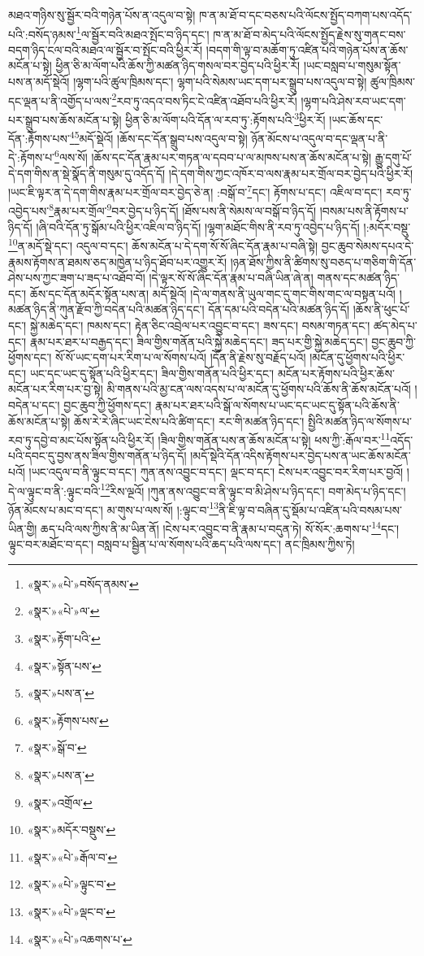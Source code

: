 མཐའ་གཉིས་སུ་སྦྱོར་བའི་གཉེན་པོས་ན་འདུལ་བ་སྟེ། ཁ་ན་མ་ཐོ་བ་དང་བཅས་པའི་ལོངས་སྤྱོད་བཀག་པས་འདོད་པའི་:བསོད་ཉམས་\footnote{«སྣར་»«པེ་»བསོད་ནམས་}ལ་སྦྱོར་བའི་མཐའ་སྤོང་བ་ཉིད་དང་། ཁ་ན་མ་ཐོ་བ་མེད་པའི་ལོངས་སྤྱོད་རྗེས་སུ་གནང་བས་བདག་ཉིད་ངལ་བའི་མཐའ་ལ་སྦྱོར་བ་སྤོང་བའི་ཕྱིར་རོ། །བདག་གི་ལྟ་བ་མཆོག་ཏུ་འཛིན་པའི་གཉེན་པོས་ན་ཆོས་མངོན་པ་སྟེ། ཕྱིན་ཅི་མ་ལོག་པའི་ཆོས་ཀྱི་མཚན་ཉིད་གསལ་བར་བྱེད་པའི་ཕྱིར་རོ། །ཡང་བསླབ་པ་གསུམ་སྟོན་པས་ན་མདོ་སྡེའོ། །ལྷག་པའི་ཚུལ་ཁྲིམས་དང་། ལྷག་པའི་སེམས་ཡང་དག་པར་སྒྲུབ་པས་འདུལ་བ་སྟེ། ཚུལ་ཁྲིམས་དང་ལྡན་པ་ནི་འགྱོད་པ་ལས་\footnote{«སྣར་»«པེ་»ལ་}རབ་ཏུ་འདའ་བས་ཏིང་ངེ་འཛིན་འཐོབ་པའི་ཕྱིར་རོ། །ལྷག་པའི་ཤེས་རབ་ཡང་དག་པར་སྒྲུབ་པས་ཆོས་མངོན་པ་སྟེ། ཕྱིན་ཅི་མ་ལོག་པའི་དོན་ལ་རབ་ཏུ་:རྟོགས་པའི་\footnote{«སྣར་»རྟོག་པའི་}ཕྱིར་རོ། །ཡང་ཆོས་དང་དོན་:རྟོགས་པས་\footnote{«སྣར་»སྟོན་པས་}\footnote{«སྣར་»པས་ན་}མདོ་སྡེའོ། །ཆོས་དང་དོན་སྒྲུབ་པས་འདུལ་བ་སྟེ། ཉོན་མོངས་པ་འདུལ་བ་དང་ལྡན་པ་ནི་དེ་:རྟོགས་པ་\footnote{«སྣར་»རྟོགས་པས་}ལས་སོ། །ཆོས་དང་དོན་རྣམ་པར་གཏན་ལ་དབབ་པ་ལ་མཁས་པས་ན་ཆོས་མངོན་པ་སྟེ། རྒྱུ་དགུ་པོ་དེ་དག་གིས་ན་སྡེ་སྣོད་ནི་གསུམ་དུ་འདོད་དོ། །དེ་དག་གིས་ཀྱང་འཁོར་བ་ལས་རྣམ་པར་གྲོལ་བར་བྱེད་པའི་ཕྱིར་རོ། །ཡང་ཇི་ལྟར་ན་དེ་དག་གིས་རྣམ་པར་གྲོལ་བར་བྱེད་ཅེ་ན། :བསྒོ་བ་\footnote{«སྣར་»སྒོ་བ་}དང་། རྟོགས་པ་དང་། འཇིལ་བ་དང་། རབ་ཏུ་འབྱེད་པས་\footnote{«སྣར་»པས་ན་}རྣམ་པར་གྲོལ་\footnote{«སྣར་»འགྲོལ་}བར་བྱེད་པ་ཉིད་དོ། །ཐོས་པས་ནི་སེམས་ལ་བསྒོ་བ་ཉིད་དོ། །བསམ་པས་ནི་རྟོགས་པ་ཉིད་དོ། །ཞི་བའི་དོན་ཏུ་སྒོམ་པའི་ཕྱིར་འཇིལ་བ་ཉིད་དོ། །ལྷག་མཐོང་གིས་ནི་རབ་ཏུ་འབྱེད་པ་ཉིད་དོ། །:མདོར་བསྡུ་\footnote{«སྣར་»མདོར་བསྡུས་}ན་མདོ་སྡེ་དང་། འདུལ་བ་དང་། ཆོས་མངོན་པ་དེ་དག་སོ་སོ་ཞིང་དོན་རྣམ་པ་བཞི་སྟེ། བྱང་ཆུབ་སེམས་དཔའ་དེ་རྣམས་རྟོགས་ན་ཐམས་ཅད་མཁྱེན་པ་ཉིད་ཐོབ་པར་འགྱུར་རོ། །ཉན་ཐོས་ཀྱིས་ནི་ཚིགས་སུ་བཅད་པ་གཅིག་གི་དོན་ཤེས་པས་ཀྱང་ཟག་པ་ཟད་པ་འཐོབ་བོ། །དེ་ལྟར་སོ་སོ་ཞིང་དོན་རྣམ་པ་བཞི་ཡིན་ཞེ་ན། གནས་དང་མཚན་ཉིད་དང་། ཆོས་དང་དོན་མདོར་སྟོན་པས་ན། མདོ་སྡེའོ། །དེ་ལ་གནས་ནི་ཡུལ་གང་དུ་གང་གིས་གང་ལ་བསྟན་པའོ། །མཚན་ཉིད་ནི་ཀུན་རྫོབ་ཀྱི་བདེན་པའི་མཚན་ཉིད་དང་། དོན་དམ་པའི་བདེན་པའི་མཚན་ཉིད་དོ། །ཆོས་ནི་ཕུང་པོ་དང་། སྐྱེ་མཆེད་དང་། ཁམས་དང་། རྟེན་ཅིང་འབྲེལ་པར་འབྱུང་བ་དང་། ཟས་དང་། བསམ་གཏན་དང་། ཚད་མེད་པ་དང་། རྣམ་པར་ཐར་པ་བརྒྱད་དང་། ཟིལ་གྱིས་གནོན་པའི་སྐྱེ་མཆེད་དང་། ཟད་པར་གྱི་སྐྱེ་མཆེད་དང་། བྱང་ཆུབ་ཀྱི་ཕྱོགས་དང་། སོ་སོ་ཡང་དག་པར་རིག་པ་ལ་སོགས་པའོ། །དོན་ནི་རྗེས་སུ་བརྗོད་པའོ། །མངོན་དུ་ཕྱོགས་པའི་ཕྱིར་དང་། ཡང་དང་ཡང་དུ་སྟོན་པའི་ཕྱིར་དང་། ཟིལ་གྱིས་གནོན་པའི་ཕྱིར་དང་། མངོན་པར་རྟོགས་པའི་ཕྱིར་ཆོས་མངོན་པར་རིག་པར་བྱ་སྟེ། མི་གནས་པའི་མྱ་ངན་ལས་འདས་པ་ལ་མངོན་དུ་ཕྱོགས་པའི་ཆོས་ནི་ཆོས་མངོན་པའོ། །བདེན་པ་དང་། བྱང་ཆུབ་ཀྱི་ཕྱོགས་དང་། རྣམ་པར་ཐར་པའི་སྒོ་ལ་སོགས་པ་ཡང་དང་ཡང་དུ་སྟོན་པའི་ཆོས་ནི་ཆོས་མངོན་པ་སྟེ། ཆོས་རེ་རེ་ཞིང་ཡང་ངེས་པའི་ཚིག་དང་། རང་གི་མཚན་ཉིད་དང་། སྤྱིའི་མཚན་ཉིད་ལ་སོགས་པ་རབ་ཏུ་དབྱེ་བ་མང་པོས་སྟོན་པའི་ཕྱིར་རོ། །ཟིལ་གྱིས་གནོན་པས་ན་ཆོས་མངོན་པ་སྟེ། ཕས་ཀྱི་:རྒོལ་བར་\footnote{«སྣར་»«པེ་»རྒོལ་བ་}འདོད་པའི་དབང་དུ་བྱས་ནས་ཟིལ་གྱིས་གནོན་པ་ཉིད་དོ། །མདོ་སྡེའི་དོན་འདིས་རྟོགས་པར་བྱེད་པས་ན་ཡང་ཆོས་མངོན་པའོ། །ཡང་འདུལ་བ་ནི་ལྟུང་བ་དང་། ཀུན་ནས་འབྱུང་བ་དང་། ལྡང་བ་དང་། ངེས་པར་འབྱུང་བར་རིག་པར་བྱའོ། །དེ་ལ་ལྟུང་བ་ནི་:ལྟུང་བའི་\footnote{«སྣར་»«པེ་»ལྟུང་བ་}རིས་ལྔའོ། །ཀུན་ནས་འབྱུང་བ་ནི་ལྟུང་བ་མི་ཤེས་པ་ཉིད་དང་། བག་མེད་པ་ཉིད་དང་། ཉོན་མོངས་པ་མང་བ་དང་། མ་གུས་པ་ལས་སོ། །:ལྟུང་བ་\footnote{«སྣར་»«པེ་»ལྡང་བ་}ནི་ཇི་ལྟ་བ་བཞིན་དུ་སྡོམ་པ་འཛིན་པའི་བསམ་པས་ཡིན་གྱི། ཆད་པའི་ལས་ཀྱིས་ནི་མ་ཡིན་ནོ། །ངེས་པར་འབྱུང་བ་ནི་རྣམ་པ་བདུན་ཏེ། སོ་སོར་:ཆགས་པ་\footnote{«སྣར་»«པེ་»འཆགས་པ་}དང་། ལྟུང་བར་མཐོང་བ་དང་། བསླབ་པ་སྦྱིན་པ་ལ་སོགས་པའི་ཆད་པའི་ལས་དང་། ནང་ཁྲིམས་ཀྱིས་ཏེ། 